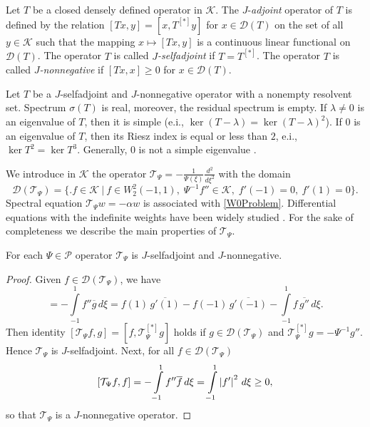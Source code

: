 \documentclass[11pt,english]{amsart}%
\begin{document}
Let $T$ be a closed densely defined operator in $\mathcal{K}$.
The $J$-\textit{adjoint} operator of $T$ is defined by the
relation $[Tx,y]=[x,T^{[*]}y]$ for $x\in \mathcal{D}(T)$
on the set of all $y\in \mathcal{K}$ such that the mapping $x\mapsto [Tx, y]$ is a continuous linear functional on
$\mathcal{D}(T)$. The operator $T$ is called $J$\textit{-selfadjoint} if $T = T^{[*]}$.
The operator  $T$ is called \emph{$J$-nonnegative} if $[Tx,x]\geq0$ for  $x\in \mathcal{D}(T)$.
\begin{g_lemma}\label{LemmaJ}
Let $T$ be a $J$-selfadjoint and $J$-nonnegative operator with a nonempty resolvent set.
Spectrum $\sigma(T)$ is real, moreover, the residual spectrum is empty. If $\lambda\neq 0$ is
an eigenvalue of $T$, then it is simple (e.i., $\ker (T-\lambda)=\ker (T-\lambda)^2$).
If $0$ is an eigenvalue of $T$,  then its Riesz index is equal or less than $2$, e.i., $\ker T^2=\ker T^3$.
Generally, $0$ is not a simple eigenvalue \cite[p. 138]{IA}.
\end{g_lemma}
We introduce in $\mathcal{K}$ the operator $\mathcal{T}_\Psi=-\frac{1}{\Psi(\xi)}\frac{d^2}{d\xi^2}$ with the domain
$$
\mathcal{D}(\mathcal{T}_\Psi)=\{\bigl.f\in \mathcal{K}\:\bigr|\: f\in
W_2^2(-1,1),\; \Psi^{-1}f''\in \mathcal{K},\; f'(-1)=0,\:f'(1)=0
\}.
$$
Spectral equation $\mathcal{T}_\Psi w=-\alpha w$ is associated with \eqref{W0Problem}.
Differential equations with the indefinite weights have been widely studied  \cite{CurJDE, IohvidovKreinLanger, KarabashKostenkoMalamud, PiatkovSMZh}. For the sake of completeness we describe the main properties of $\mathcal{T}_\Psi$.
\begin{g_theorem}\label{ThJproperties}
For each  $\Psi\in \mathcal{P}$  operator $\mathcal{T}_\Psi$ is $J$-selfadjoint and $J$-non\-ne\-ga\-tive.
\end{g_theorem}
\begin{proof}
Given $f\in \mathcal{D}(\mathcal{T}_\Psi)$, we have
\begin{equation*}
[\mathcal{T}_\Psi f,g]=-\int\limits_{-1}^1f''\overline{g}\,d\xi=
f(1)\,\overline{g'(1)}-f(-1)\,\overline{g'(-1)}
-\int\limits_{-1}^1f\,\overline{{g}''}\,d\xi.
\end{equation*}
Then  identity $[\mathcal{T}_\Psi f,g]=[f,\mathcal{T}_\Psi^{[*]} g]$ holds
if $g\in \mathcal{D}(\mathcal{T}_\Psi)$ and $\mathcal{T}_\Psi^{[*]} g=-\Psi^{-1}g''$. Hence  $\mathcal{T}_\Psi$ is $J$-selfadjoint. Next, for all $f\in \mathcal{D}(\mathcal{T}_\Psi)$
$$
[\mathcal{T}_\Psi f,f]=-\int\limits_{-1}^1f'' \overline{f}\,d\xi=
\int\limits_{-1}^1\left\vert f'\right\vert^2\,d\xi\geq0,
$$
so that   $\mathcal{T}_\Psi$ is a $J$-nonnegative operator.
\end{proof}
\end{document}
